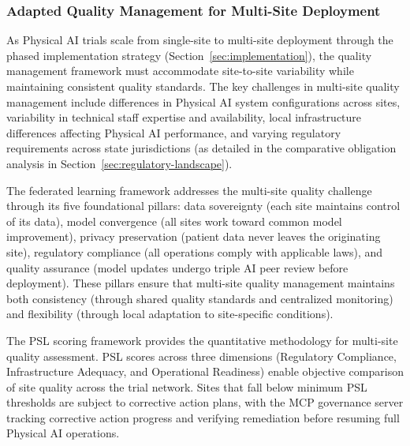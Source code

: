 \subsubsection{Adapted Quality Management for Multi-Site Deployment}

As Physical AI trials scale from single-site to multi-site deployment
through the phased implementation strategy
(Section~\ref{sec:implementation}), the quality management framework must
accommodate site-to-site variability while maintaining consistent quality
standards. The key challenges in multi-site quality management include
differences in Physical AI system configurations across sites, variability
in technical staff expertise and availability, local infrastructure
differences affecting Physical AI performance, and varying regulatory
requirements across state jurisdictions (as detailed in the comparative
obligation analysis in Section~\ref{sec:regulatory-landscape}).

The federated learning framework \cite{fl-paper} addresses the multi-site
quality challenge through its five foundational pillars: data sovereignty
(each site maintains control of its data), model convergence (all sites
work toward common model improvement), privacy preservation (patient data
never leaves the originating site), regulatory compliance (all operations
comply with applicable laws), and quality assurance (model updates undergo
triple AI peer review before deployment). These pillars ensure that
multi-site quality management maintains both consistency (through shared
quality standards and centralized monitoring) and flexibility (through local
adaptation to site-specific conditions).

The PSL scoring framework \cite{usl-standard} provides the quantitative
methodology for multi-site quality assessment. PSL scores across three
dimensions (Regulatory Compliance, Infrastructure Adequacy, and Operational
Readiness) enable objective comparison of site quality across the trial
network. Sites that fall below minimum PSL thresholds are subject to
corrective action plans, with the MCP governance server tracking corrective
action progress and verifying remediation before resuming full Physical AI
operations.

